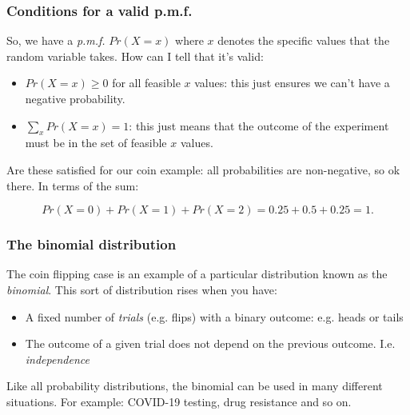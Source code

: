 \documentclass{beamer}
\begin{document}
	\begin{frame}
		\frametitle{Conditions for a valid p.m.f.}
		
		So, we have a \textit{p.m.f.} $Pr(X=x)$ where $x$ denotes the specific values that the random variable takes. How can I tell that it's valid:
		
		\begin{itemize}
			\item $Pr(X=x) \geq 0$ for all feasible $x$ values: this just ensures we can't have a negative probability.
			\item $\sum_{x} Pr(X=x) = 1$: this just means that the outcome of the experiment must be in the set of feasible $x$ values.
		\end{itemize}
		
		Are these satisfied for our coin example: all probabilities are non-negative, so ok there. In terms of the sum:
		
		\begin{equation}
		Pr(X=0) + Pr(X=1) + Pr(X=2) = 0.25 + 0.5 + 0.25 = 1.
		\end{equation}
		
	\end{frame}
	
	\begin{frame}
		\frametitle{The binomial distribution}
		The coin flipping case is an example of a particular distribution known as the \textit{binomial}. This sort of distribution rises when you have:
		
		\begin{itemize}
			\item A fixed number of \textit{trials} (e.g. flips) with a binary outcome: e.g. heads or tails
			\item The outcome of a given trial does not depend on the previous outcome. I.e. \textit{independence}
		\end{itemize}
		
		Like all probability distributions, the binomial can be used in many different situations. For example: COVID-19 testing, drug resistance and so on.
		
	\end{frame}
	
\end{document}
